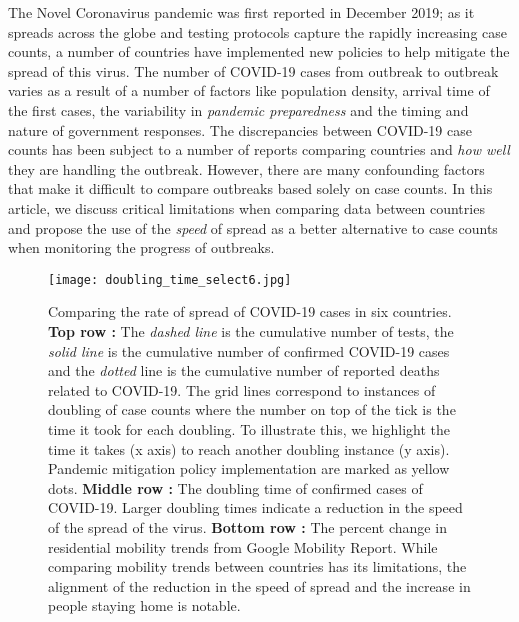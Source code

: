 \documentclass[alpha-refs]{wiley-article}
\begin{document}
The Novel Coronavirus pandemic was first reported in December 2019; as it spreads across the globe and testing protocols capture the rapidly increasing case counts, a number of countries have implemented new policies to help mitigate the spread of this virus.
The number of COVID-19 cases from outbreak to outbreak varies as a result of a number of factors like population density, arrival time of the first cases, the variability in \textit{pandemic preparedness} and the timing and nature of government responses.
The discrepancies between COVID-19 case counts has been subject to a number of reports comparing countries and \textit{how well} they are handling the outbreak.
However, there are many confounding factors that make it difficult to compare outbreaks based solely on case counts.
In this article, we discuss critical limitations when comparing data between countries and propose the use of the \textit{speed} of spread as a better alternative to case counts when monitoring the progress of outbreaks.


\begin{figure}[bt]
\centering
\texttt{[image: doubling\_time\_select6.jpg]}
\caption{
Comparing the rate of spread of COVID-19 cases in six countries.
\textbf{Top row :}  
The \textit{dashed line} is the cumulative number of tests, the \textit{solid line} is the cumulative number of confirmed COVID-19 cases and the \textit{dotted} line is the cumulative number of reported deaths related to COVID-19.
The grid lines correspond to instances of doubling of case counts where the number on top of the tick is the time it took for each doubling. 
To illustrate this, we highlight the time it takes (x axis) to reach another doubling instance (y axis).
Pandemic mitigation policy implementation are marked as yellow dots.
\textbf{Middle row :}  
The doubling time of confirmed cases of COVID-19. Larger doubling times indicate a reduction in the speed of the spread of the virus.
\textbf{Bottom row :}  
The percent change in residential mobility trends from Google Mobility Report. 
While comparing mobility trends between countries has its limitations, the alignment of the reduction in the speed of spread and the increase in people staying home is notable.
}
\label{doub_time}
\end{figure}
\end{document}
